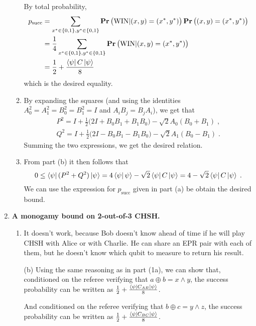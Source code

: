 \documentclass[12pt]{article}
\begin{document}
\begin{enumerate}
\begin{enumerate}
By total probability, 
\begin{align*}
	p_{\text{succ}} &= \sum_{x^* \in \{0, 1\}, y^* \in \{0, 1\}} \mathop{\bf Pr\/}\big(\text{WIN}| (x,y)=(x^*,y^*)\big) \mathop{\bf Pr\/}\big((x,y)=(x^*,y^*)\big)\\
	&= \frac{1}{4}\sum_{x^* \in \{0, 1\}, y^* \in \{0, 1\}} \mathop{\bf Pr\/}\big(\text{WIN}| (x,y)=(x^*,y^*)\big)\\
	&= \frac{1}{2} + \frac{\bra{\psi} C \ket{\psi}}{8}\;
\end{align*}
which is the desired equality.
\item By expanding the squares (and using the identities $A_0^2 = A_1^2 = B_0^2 = B_1^2 = I$ and $A_iB_j = B_j A_i$), we get that
\begin{align*}
P^2 = I + \frac{1}{2}\big(2I+B_0B_1+B_1B_0\big) -\sqrt{2}A_0(B_0+B_1)\;,\\
Q^2 = I + \frac{1}{2}\big(2I-B_0B_1-B_1B_0\big) -\sqrt{2}A_1(B_0-B_1)\;.
\end{align*}
Summing the two expressions, we get the desired relation. 
\item From part (b) it then follows that 
\[ 0\leq \bra{\psi}(P^2+Q^2)\ket{\psi} = 4 \bra{\psi}\psi\rangle - \sqrt{2}\bra{\psi}C\ket{\psi} = 4 - \sqrt{2}\bra{\psi}C\ket{\psi}\;.\]
We can use the expression for $p_{\text{succ}}$ given in part (a) be obtain the desired bound. 
\end{enumerate}

\item \textbf{A monogamy bound on 2-out-of-3 CHSH. }
\begin{enumerate}
\item It doesn't work, because Bob doesn't know ahead of time if he will play CHSH with Alice or with Charlie. He can share an EPR pair with each of them, but he doesn't know which qubit to measure to return his result. 
\item[(b)]
Using the same reasoning as in part (1a), we can show that, conditioned on the referee verifying that $a \oplus b = x \wedge y$, the success probability can be written as $\frac{1}{2} + \frac{\bra{\psi} C_{AB}\ket{\psi}}{8}$.

And conditioned on the referee verifying that $b \oplus c = y \wedge z$, the success probability can be written as $\frac{1}{2} + \frac{\bra{\psi} C_{BC}\ket{\psi}}{8}$.


\end{enumerate}
\end{enumerate}
\end{document}
